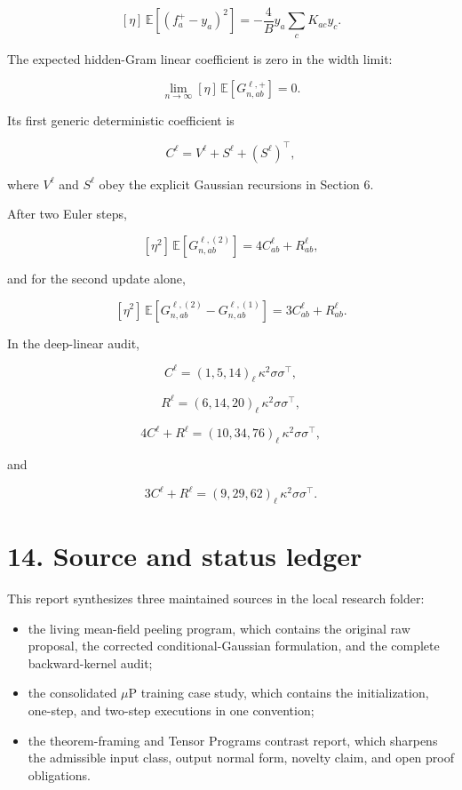 \[
[\eta]\,\mathbb E[(f_a^+-y_a)^2]
=
-\frac4B y_a\sum_cK_{ac}y_c.
\]


The expected hidden-Gram linear coefficient is zero in the width limit:

\[
\lim_{n\to\infty}
[\eta]\,\mathbb E[G^{\ell,+}_{n,ab}]
=
0.
\]


Its first generic deterministic coefficient is

\[
C^\ell=V^\ell+S^\ell+(S^\ell)^\top,
\]


where \(V^\ell\) and \(S^\ell\) obey the explicit Gaussian recursions in
Section 6.

After two Euler steps,

\[
[\eta^2]\,\mathbb E[G^{\ell,(2)}_{n,ab}]
=
4C^\ell_{ab}+R^\ell_{ab},
\]


and for the second update alone,

\[
[\eta^2]\,
\mathbb E[G^{\ell,(2)}_{n,ab}-G^{\ell,(1)}_{n,ab}]
=
3C^\ell_{ab}+R^\ell_{ab}.
\]


In the deep-linear audit,

\[
C^\ell=(1,5,14)_\ell\,
\kappa^2\sigma\sigma^\top,
\]


\[
R^\ell=(6,14,20)_\ell\,
\kappa^2\sigma\sigma^\top,
\]


\[
4C^\ell+R^\ell
=(10,34,76)_\ell\,
\kappa^2\sigma\sigma^\top,
\]


and

\[
3C^\ell+R^\ell
=(9,29,62)_\ell\,
\kappa^2\sigma\sigma^\top.
\]


\section*{14. Source and status ledger}


This report synthesizes three maintained sources in the local research
folder:

\begin{itemize}
\item the living mean-field peeling program, which contains the original raw
  proposal, the corrected conditional-Gaussian formulation, and the complete
  backward-kernel audit;
\item the consolidated \(\mu\)P training case study, which contains the
  initialization, one-step, and two-step executions in one convention;
\item the theorem-framing and Tensor Programs contrast report, which sharpens the
  admissible input class, output normal form, novelty claim, and open proof
  obligations.
\end{itemize}



